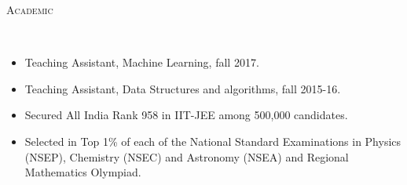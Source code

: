 \documentclass[9pt]{article}
\newenvironment{changemargin}[2]{%
  \begin{list}{}{%
    \setlength{\topsep}{0pt}%
    \setlength{\leftmargin}{#1}%
    \setlength{\rightmargin}{#2}%
    \setlength{\listparindent}{\parindent}%
    \setlength{\itemindent}{\parindent}%
    \setlength{\parsep}{\parskip}%
  }%
  \item[]}{\end{list}
}
\newcommand{\lineover}{
	\begin{changemargin}{-0.05in}{-0.10in}
		\vspace*{-9pt}
		\hrulefill \\
		\vspace*{-2pt}
	\end{changemargin}
}
\newcommand{\header}[1]{
	\begin{changemargin}{-0.5in}{-0.5in}
		\scshape{#1}\\
  	\lineover
	\end{changemargin}
}
\newenvironment{body} {
	\vspace*{-16pt}
	\begin{changemargin}{-0.6in}{-0.65in}
  }	
	{\end{changemargin}
}
\begin{document}

	  

\header{Academic}
\begin{body}
	\vspace{14pt}
	\begin{changemargin}{0.15in}{0.15in}
	\begin{itemize}
	  \item Teaching Assistant, Machine Learning, fall 2017.
	  \item Teaching Assistant, Data Structures and algorithms, fall 2015-16.
	  \item Secured All India Rank 958 in IIT-JEE among 500,000 candidates.
	  \item Selected in Top 1\% of each of the National Standard Examinations in Physics (NSEP), Chemistry (NSEC) and Astronomy (NSEA) and Regional Mathematics Olympiad.
	\end{itemize}
	\end{changemargin}
\end{body}
\end{document}
